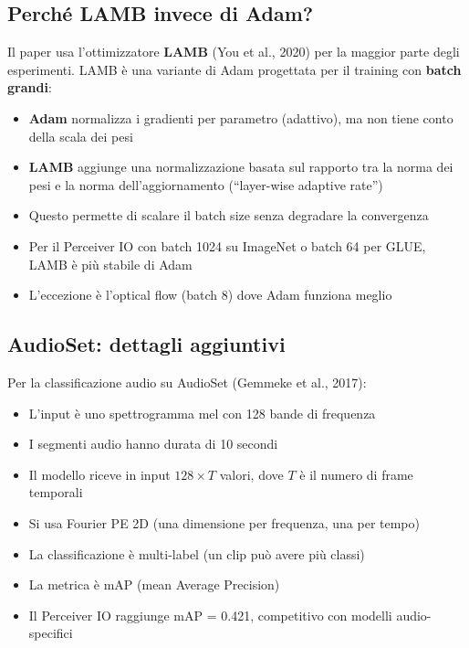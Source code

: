 \documentclass[12pt,a4paper]{article}
\begin{document}
\subsection{Perch\'e LAMB invece di Adam?}

Il paper usa l'ottimizzatore \textbf{LAMB} (You et al., 2020) per la maggior parte degli esperimenti. LAMB \`e una variante di Adam progettata per il training con \textbf{batch grandi}:

\begin{itemize}
    \item \textbf{Adam} normalizza i gradienti per parametro (adattivo), ma non tiene conto della scala dei pesi
    \item \textbf{LAMB} aggiunge una normalizzazione basata sul rapporto tra la norma dei pesi e la norma dell'aggiornamento (``layer-wise adaptive rate'')
    \item Questo permette di scalare il batch size senza degradare la convergenza
    \item Per il Perceiver IO con batch 1024 su ImageNet o batch 64 per GLUE, LAMB \`e pi\`u stabile di Adam
    \item L'eccezione \`e l'optical flow (batch 8) dove Adam funziona meglio
\end{itemize}

\subsection{AudioSet: dettagli aggiuntivi}

Per la classificazione audio su AudioSet (Gemmeke et al., 2017):
\begin{itemize}
    \item L'input \`e uno spettrogramma mel con 128 bande di frequenza
    \item I segmenti audio hanno durata di 10 secondi
    \item Il modello riceve in input $128 \times T$ valori, dove $T$ \`e il numero di frame temporali
    \item Si usa Fourier PE 2D (una dimensione per frequenza, una per tempo)
    \item La classificazione \`e multi-label (un clip pu\`o avere pi\`u classi)
    \item La metrica \`e mAP (mean Average Precision)
    \item Il Perceiver IO raggiunge mAP = 0.421, competitivo con modelli audio-specifici
\end{itemize}
\end{document}
